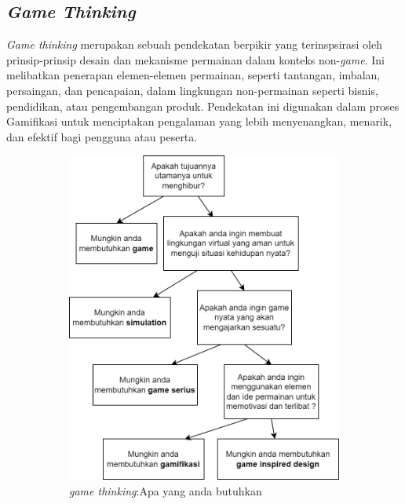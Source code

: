 \subsection{\textit{Game Thinking}}
\textit{Game thinking} merupakan sebuah pendekatan berpikir yang terinspsirasi oleh prinsip-prinsip desain dan mekanisme permainan dalam konteks non-\textit{game}. 
Ini melibatkan penerapan elemen-elemen permainan, seperti tantangan, imbalan, persaingan, dan pencapaian, dalam lingkungan non-permainan seperti bisnis, pendidikan, atau pengembangan produk\cite{schell2008art}.
Pendekatan ini digunakan dalam proses Gamifikasi untuk menciptakan pengalaman yang lebih menyenangkan, menarik, dan efektif bagi pengguna atau peserta.
\begin{figure}[H]
	\centering
	\begin{subfigure}[b]{0.4\textwidth}
		\centering
	  \includegraphics[width=\linewidth]{contents/chapter-2/images/Game-thinking-2.png}
	  \caption{\textit{game thinking}:Apa yang anda butuhkan}
	  \label{fig:sub-gamethink-1}
	\end{subfigure}
	\hfill
	\begin{subfigure}[b]{0.4\textwidth}

\end{subfigure}
\end{figure}
